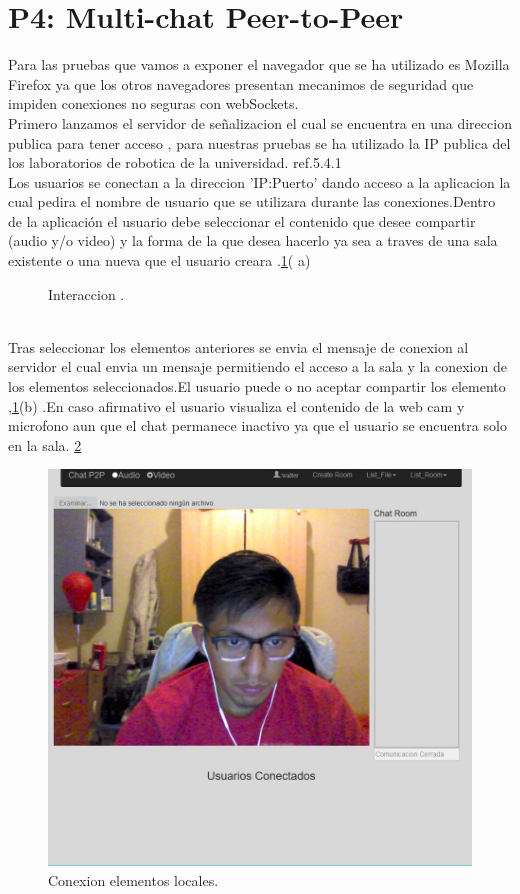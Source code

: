 \section{P4: Multi-chat Peer-to-Peer}
Para las pruebas que vamos a exponer el navegador que se ha utilizado es Mozilla Firefox ya que los otros navegadores presentan mecanimos de seguridad que impiden conexiones no seguras con webSockets.
\\Primero  lanzamos el servidor de señalizacion el cual se encuentra en una direccion publica para tener acceso , para nuestras pruebas se ha utilizado la IP publica del los laboratorios de robotica de la universidad.  ref.5.4.1
\\Los usuarios se conectan a la direccion  'IP:Puerto' dando acceso a la aplicacion la cual pedira el  nombre de usuario que se utilizara durante las conexiones.Dentro de la aplicación el usuario debe seleccionar el contenido que desee compartir (audio y/o video)  y la forma de la que desea hacerlo ya sea a traves de una sala existente o una nueva que el usuario creara .\ref{fig:Interaccion}( a)
\begin{figure}[htbp]
\centering
{}\hspace{5mm}
\caption{Interaccion .} \label{fig:Interaccion}
\end{figure}
\\Tras seleccionar los elementos anteriores se envia el mensaje de conexion al servidor el cual envia un mensaje permitiendo el acceso a la sala y la conexion de los elementos seleccionados.El usuario puede o no aceptar compartir los elemento ,\ref{fig:Interaccion}(b) .En caso afirmativo el usuario visualiza el contenido de la web cam y microfono aun que el chat permanece inactivo ya que el usuario se encuentra solo en la sala. \ref{fig:ConnectElementLocal}
\begin{figure}[!h]
\centering
\includegraphics[width=0.8\linewidth]{Figures/Coneccion}
\decoRule
\caption[An Electron]{Conexion elementos locales.}
\label{fig:ConnectElementLocal}
\end{figure}
